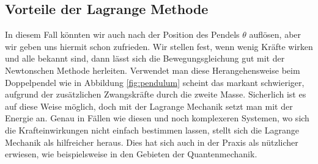 \subsection{Vorteile der Lagrange Methode}
In diesem Fall könnten wir auch nach der Position des Pendels \(\theta\) auflösen,
aber wir geben uns hiermit schon zufrieden.
Wir stellen fest, wenn wenig Kräfte wirken und alle bekannt sind,
dann lässt sich die Bewegungsgleichung gut mit der Newtonschen Methode herleiten.
Verwendet man diese Herangehensweise beim Doppelpendel wie in Abbildung \ref{fig:pendulum}
scheint das markant schwieriger, aufgrund der zusätzlichen Zwangskräfte durch die zweite Masse.
Sicherlich ist es auf diese Weise möglich, doch mit der Lagrange Mechanik setzt man mit der Energie an.
Genau in Fällen wie diesen und noch komplexeren Systemen, wo sich die Krafteinwirkungen nicht einfach
bestimmen lassen, stellt sich die Lagrange Mechanik als hilfreicher heraus.
Dies hat sich auch in der Praxis als nützlicher erwiesen, wie beispielsweise 
in den Gebieten der Quantenmechanik.%
